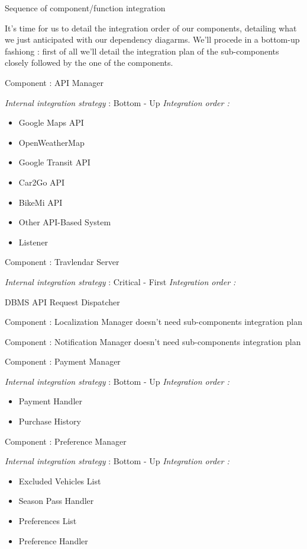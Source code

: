 Sequence of component/function integration

It's time for us to detail the integration order of our components, detailing what we just anticipated with our dependency diagarms.
We'll procede in a bottom-up fashiong : first of all we'll detail the integration plan of the sub-components closely followed by the one of the components.


Component : API Manager

\textit{Internal integration strategy} : Bottom - Up
\textit{Integration order :}
	\begin{itemize}
		\item Google Maps API
		\item OpenWeatherMap
		\item Google Transit API
		\item Car2Go API
		\item BikeMi API
		\item Other API-Based System
		\item Listener
	\end{itemize}


Component : Travlendar Server

\textit{Internal integration strategy} : Critical - First
\textit{Integration order :}
	\begin{itemize}
		\itemize DBMS
		\itemize API Request Dispatcher
	\end{itemize}
	
Component : Localization Manager doesn't need sub-components integration plan

Component : Notification Manager doesn't need sub-components integration plan
	

Component : Payment Manager

\textit{Internal integration strategy} : Bottom - Up
\textit{Integration order :}
	\begin{itemize}
		\item Payment Handler
		\item Purchase History
	\end{itemize}
	
Component : Preference Manager

\textit{Internal integration strategy} : Bottom - Up
\textit{Integration order :}
	\begin{itemize}
	
		\item Excluded Vehicles List
		\item Season Pass Handler
		\item Preferences List
		\item Preference Handler
		
	\end{itemize}
	
